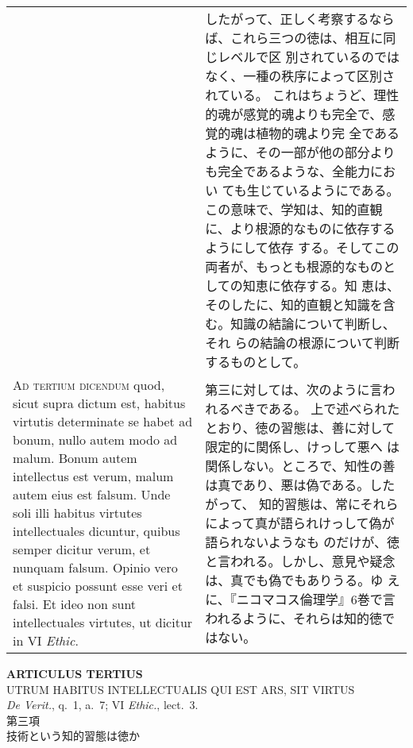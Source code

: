 \documentclass[10pt]{jsarticle} %
\begin{document}
\begin{longtable}{p{21em}p{21em}}
&

したがって、正しく考察するならば、これら三つの徳は、相互に同じレベルで区
 別されているのではなく、一種の秩序によって区別されている。
これはちょうど、理性的魂が感覚的魂よりも完全で、感覚的魂は植物的魂より完
 全であるように、その一部が他の部分よりも完全であるような、全能力におい
 ても生じているようにである。
この意味で、学知は、知的直観に、より根源的なものに依存するようにして依存
 する。そしてこの両者が、もっとも根源的なものとしての知恵に依存する。知
 恵は、そのしたに、知的直観と知識を含む。知識の結論について判断し、それ
 らの結論の根源について判断するものとして。



\\



{\scshape Ad tertium dicendum} quod, sicut supra
 dictum est, habitus virtutis determinate se habet ad bonum, nullo autem
 modo ad malum. Bonum autem intellectus est verum, malum autem eius est
 falsum. Unde soli illi habitus virtutes intellectuales dicuntur, quibus
 semper dicitur verum, et nunquam falsum. Opinio vero et suspicio
 possunt esse veri et falsi. Et ideo non sunt intellectuales virtutes,
 ut dicitur in VI {\itshape Ethic}.

&

第三に対しては、次のように言われるべきである。
上で述べられたとおり、徳の習態は、善に対して限定的に関係し、けっして悪へ
 は関係しない。ところで、知性の善は真であり、悪は偽である。したがって、
 知的習態は、常にそれらによって真が語られけっして偽が語られないようなも
 のだけが、徳と言われる。しかし、意見や疑念は、真でも偽でもありうる。ゆ
 えに、『ニコマコス倫理学』6巻で言われるように、それらは知的徳ではない。




\end{longtable}


\newpage


\begin{center}
 {\Large {\bf ARTICULUS TERTIUS}}\\
 {\large UTRUM HABITUS INTELLECTUALIS QUI EST ARS, SIT VIRTUS}\\
 {\footnotesize {\itshape De Verit.}, q.~1, a.~7; VI {\itshape Ethic.}, lect.~3.}\\
 {\Large 第三項\\技術という知的習態は徳か}
\end{center}
\end{document}
